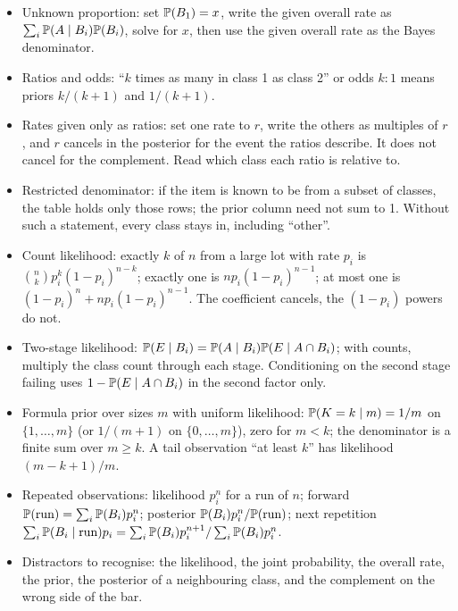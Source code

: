 \begin{itemize}[nosep,leftmargin=2em]
        $\Prob(\text{at least one claim} \mid B_i) = 1 - (1 - p_i)^2$. Then
        $\Prob(C_2 \mid C_1) = \Prob(C_1 \cap C_2)/\Prob(C_1)$, each side by total probability.
        Equivalent: update the class posteriors after year one, then average the year-two rates.
  \item Unknown proportion: set $\mathbb{P}(B_1) = x$, write the given overall rate as
        $\sum_i \mathbb{P}(A \mid B_i)\mathbb{P}(B_i)$, solve for $x$, then use the given overall rate as
        the Bayes denominator.
  \item Ratios and odds: ``$k$ times as many in class 1 as class 2'' or odds $k : 1$ means
        priors $k/(k+1)$ and $1/(k+1)$.
  \item Rates given only as ratios: set one rate to $r$, write the others as multiples of $r$,
        and $r$ cancels in the posterior for the event the ratios describe. It does not cancel
        for the complement. Read which class each ratio is relative to.
  \item Restricted denominator: if the item is known to be from a subset of classes, the table
        holds only those rows; the prior column need not sum to 1. Without such a statement,
        every class stays in, including ``other''.
  \item Count likelihood: exactly $k$ of $n$ from a large lot with rate $p_i$ is
        $\binom{n}{k}p_i^k(1-p_i)^{n-k}$; exactly one is $np_i(1-p_i)^{n-1}$; at most one is
        $(1-p_i)^n + np_i(1-p_i)^{n-1}$. The coefficient cancels, the $(1-p_i)$ powers do not.
  \item Two-stage likelihood: $\mathbb{P}(E \mid B_i) = \mathbb{P}(A \mid B_i)\mathbb{P}(E \mid A \cap B_i)$;
        with counts, multiply the class count through each stage. Conditioning on the
        second stage failing uses $1 - \mathbb{P}(E \mid A \cap B_i)$ in the second factor only.
  \item Formula prior over sizes $m$ with uniform likelihood: $\mathbb{P}(K = k \mid m) = 1/m$ on
        $\{1, \dots, m\}$ (or $1/(m+1)$ on $\{0, \dots, m\}$), zero for $m < k$; the
        denominator is a finite sum over $m \geq k$. A tail observation ``at least $k$'' has
        likelihood $(m - k + 1)/m$.
  \item Repeated observations: likelihood $p_i^n$ for a run of $n$; forward
        $\mathbb{P}(\text{run}) = \sum_i \mathbb{P}(B_i)p_i^n$; posterior $\mathbb{P}(B_i)p_i^n/\mathbb{P}(\text{run})$;
        next repetition $\sum_i \mathbb{P}(B_i \mid \text{run})p_i = \sum_i \mathbb{P}(B_i)p_i^{n+1}/\sum_i \mathbb{P}(B_i)p_i^n$.
  \item Distractors to recognise: the likelihood, the joint probability, the overall rate,
        the prior, the posterior of a neighbouring class, and the complement on the wrong
        side of the bar.
\end{itemize}
